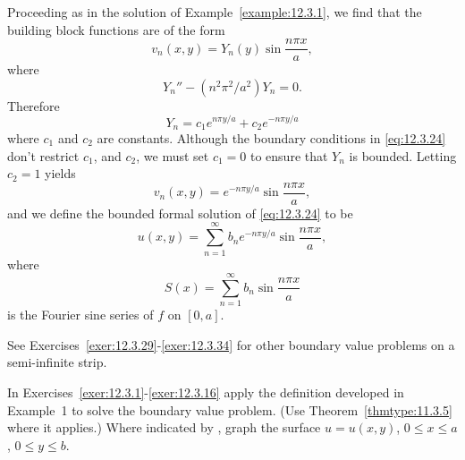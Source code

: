 \begin{examplesolution}
\solution Proceeding as in the solution of Example~\ref{example:12.3.1}, we find that the building
block functions are of the form
\[
  v_{n}(x,y)=Y_{n}(y)\sin\frac{n\pi x}{a},
\]
where
\[
  Y_{n}''-(n^{2}\pi^{2}/a^{2})Y_{n}=0.
\]
Therefore
\[
  Y_{n}=c_{1}e^{n\pi y/a}+c_{2}e^{-n\pi y/a}
\]
where $c_{1}$ and $c_{2}$ are constants. Although the boundary conditions in \eqref{eq:12.3.24}
don't restrict $c_{1}$, and $c_{2}$, we must set $c_{1}=0$ to ensure that $Y_{n}$ is bounded.
Letting $c_{2}=1$ yields
\[
  v_{n}(x,y)=e^{-n\pi y/a}\sin\frac{n\pi x}{a},
\]
and we define the bounded formal solution of \eqref{eq:12.3.24} to be
\[
  u(x,y)=\sum_{n=1}^{\infty}b_{n}e^{-n\pi y/a}\sin\frac{n\pi x}{a},
\]
where
\[
  S(x)=\sum_{n=1}^{\infty}b_{n}\sin\frac{n\pi x}{a}
\]
is the Fourier sine series of $f$ on $[0,a]$. \bbox
\end{examplesolution}

See Exercises~\ref{exer:12.3.29}-\ref{exer:12.3.34} for other boundary value problems on a
semi-infinite strip.

\exercises In Exercises~\ref{exer:12.3.1}-\ref{exer:12.3.16} apply the definition developed in Example~1 to solve the boundary value problem. (Use Theorem~\ref{thmtype:11.3.5} where it applies.) Where indicated by \Cex, graph the surface $u=u(x,y)$, $0\le x\le a$, $0\le y\le b$.

